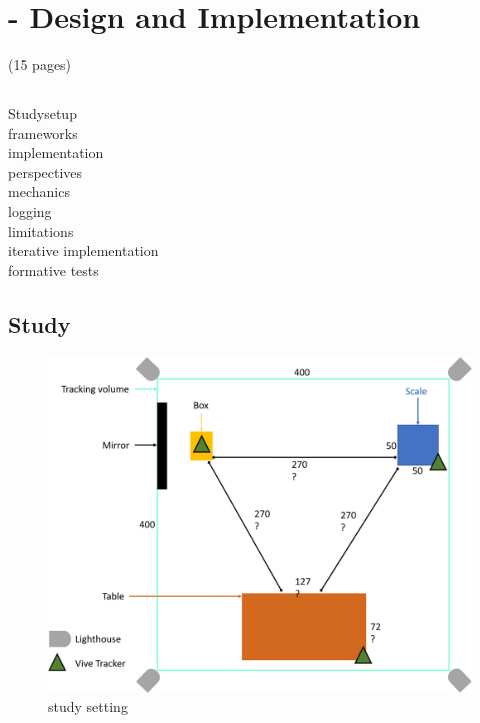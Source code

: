 \chapter{\exgo - Design and Implementation}
\label{chapter:studysetting_conduction}
(15 pages)
\section{\exgo}
\label{section:system}
Studysetup\\
frameworks\\
implementation\\
perspectives\\
mechanics\\
logging\\
limitations\\
iterative implementation\\
formative tests\\
\section{Study}
\label{section:study}

\begin{figure}[htb]
	\centering
	\includegraphics[width=\textwidth]{figures/study_setting.png}
	\caption[study setting]{study setting}
	\label{fig:study_setting}
\end{figure}

